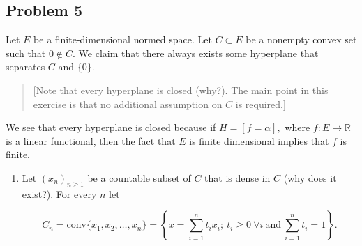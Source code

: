 \documentclass[11pt]{article}
\newcommand{\bbR}{\mathbb{R}}
\begin{document}
\begin{problem}
\begin{enumerate}
\newpage
\section*{Problem 5}
\begin{problem}
    Let \( E \) be a finite-dimensional normed space. Let \( C \subset E \) be a nonempty convex set such that \( 0 \notin C \). We claim that there always exists some hyperplane that separates \( C \) and \(\{0\}\).

\begin{quote}
    [Note that every hyperplane is closed (why?). The main point in this exercise is that no additional assumption on \( C \) is required.]
\end{quote}
\begin{solution}
    We see that every hyperplane is closed because if $H = [f = \alpha],$ where $f: E\to \bbR$ is a linear functional, then the fact that $E$ is finite dimensional implies that $f$ is finite. 
\end{solution}

\begin{enumerate}
    \item Let \((x_n)_{n \geq 1}\) be a countable subset of \( C \) that is dense in \( C \) (why does it exist?). For every \( n \) let
    

\[
    C_n = \text{conv}\{x_1, x_2, \ldots, x_n\} = \left\{ x = \sum_{i=1}^n t_i x_i; \ t_i \geq 0 \ \forall i \ \text{and} \ \sum_{i=1}^n t_i = 1 \right\}.
    \]



\end{enumerate}
\end{problem}
\end{enumerate}
\end{problem}
\end{document}

